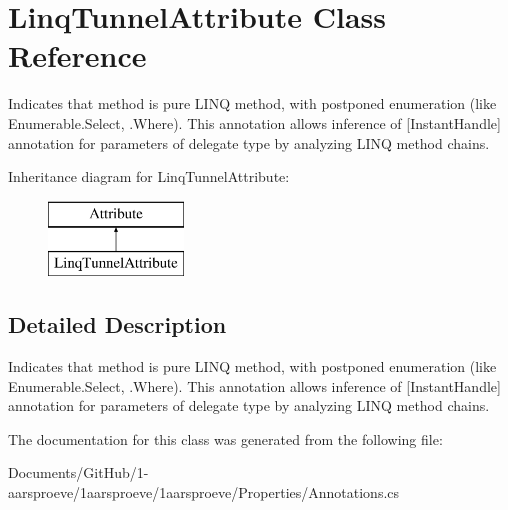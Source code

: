 \hypertarget{class_linq_tunnel_attribute}{}\section{Linq\+Tunnel\+Attribute Class Reference}
\label{class_linq_tunnel_attribute}


Indicates that method is pure L\+I\+N\+Q method, with postponed enumeration (like Enumerable.\+Select, .Where). This annotation allows inference of \mbox{[}Instant\+Handle\mbox{]} annotation for parameters of delegate type by analyzing L\+I\+N\+Q method chains.  


Inheritance diagram for Linq\+Tunnel\+Attribute\+:\begin{figure}[H]
\begin{center}
\leavevmode
\includegraphics[height=2.000000cm]{class_linq_tunnel_attribute}
\end{center}
\end{figure}


\subsection{Detailed Description}
Indicates that method is pure L\+I\+N\+Q method, with postponed enumeration (like Enumerable.\+Select, .Where). This annotation allows inference of \mbox{[}Instant\+Handle\mbox{]} annotation for parameters of delegate type by analyzing L\+I\+N\+Q method chains. 



The documentation for this class was generated from the following file\+:\begin{DoxyCompactItemize}
\item 
Documents/\+Git\+Hub/1-\/aarsproeve/1aarsproeve/1aarsproeve/\+Properties/Annotations.\+cs\end{DoxyCompactItemize}
